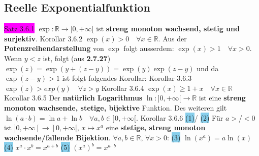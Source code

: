 \documentclass[landscape, 10pt]{article}
\newcommand{\R}{\mathbb{R}}
\begin{document}
\begin{multicols}{3}
       \subsection{Reelle Exponentialfunktion}
              \colorbox{magenta}{Satz 3.6.1} \textcolor{NavyBlue}{
                     $\exp:\R\longrightarrow]0,+\infty[$}
                     ist \textbf{streng monoton wachsend, stetig und surjektiv}.
              \colorbox{BurntOrange}{Korollar 3.6.2} 
                     \textcolor{NavyBlue}{$\exp(x)>0\quad\forall x\in\R$}. 
                     Aus der \textbf{Potenzreihendarstellung} von 
                     \textcolor{NavyBlue}{$\exp$} folgt ausserdem: 
                     \textcolor{NavyBlue}{$\exp(x)>1\quad\forall x>0$}. 
                     Wenn \textcolor{NavyBlue}{$y<z$} ist, folgt (aus \textbf{2.7.27}) 
                     \textcolor{NavyBlue}{$\exp(z)=\exp(y+(z-y))=\exp(y)\exp(z-y)$}  
                     und da \textcolor{NavyBlue}{$\exp(z-y)>1$} ist folgt folgendes Korollar:
              \colorbox{BurntOrange}{Korollar 3.6.3} 
                     \textcolor{NavyBlue}{$\exp(z)>exp(y)\quad\forall z>y$}\qquad\qquad
              \colorbox{BurntOrange}{Korollar 3.6.4} 
                     \textcolor{NavyBlue}{$\exp(x)\geqslant1+x\quad\forall x\in\R$}
              \colorbox{BurntOrange}{Korollar 3.6.5} Der \textbf{natürlich Logarithmus} 
                     $\ln:]0,+\infty[\longrightarrow\R$ ist eine \textbf{streng monoton 
                     wachsende, stetige, bijektive} Funktion. Des weiteren gilt 
                     \textcolor{NavyBlue}{$\ln(a\cdot b)=\ln a+\ln b\quad\forall a,b\in]0,+\infty[$}.
              \colorbox{BurntOrange}{Korollar 3.6.6} \colorbox{SkyBlue}{(1)}/
                     \colorbox{SkyBlue}{(2)} Für \textcolor{NavyBlue}{$a>$/$<0$} 
                     ist \textcolor{NavyBlue}{
                     $]0,+\infty[\longrightarrow]0,+\infty[,\,x\longmapsto x^a$}
                     eine \textbf{stetige, streng monoton 
                     wachsende/fallende Bijektion}. 
                     \textcolor{NavyBlue}{$\forall a,b\in\R,\,\forall x>0$}: 
                     \colorbox{SkyBlue}{(3)} \textcolor{NavyBlue}{$\ln(x^a)=a\ln(x)$}
                     \colorbox{SkyBlue}{(4)} \textcolor{NavyBlue}{$x^a\cdot x^b=x^{a+b}$}
                     \colorbox{SkyBlue}{(5)} \textcolor{NavyBlue}{$(x^a)^b=x^{a\cdot b}$}

\end{multicols}
\end{document}
